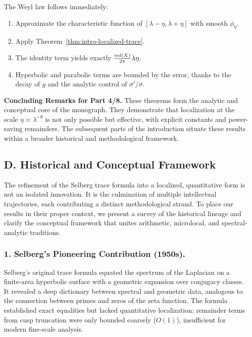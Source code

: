 The Weyl law follows immediately:

\begin{enumerate}[label=\arabic*.]
  \item Approximate the characteristic function of $[\lambda-\eta,\lambda+\eta]$
        with smooth $\phi_\eta$.
  \item Apply Theorem~\ref{thm:intro-localized-trace}.
  \item The identity term yields exactly $\frac{\operatorname{vol}(X)}{2\pi}\lambda\eta$.
  \item Hyperbolic and parabolic terms are bounded by the error,
        thanks to the decay of $g$ and the analytic control of $\sigma'/\sigma$.
\end{enumerate}

\medskip

\noindent\textbf{Concluding Remarks for Part 4/8.}
These theorems form the analytic and conceptual core of the monograph.
They demonstrate that localization at the scale $\eta\asymp\lambda^{-\theta}$
is not only possible but effective, with explicit constants and power-saving remainders.
The subsequent parts of the introduction situate these results within a broader
historical and methodological framework.


\subsection*{D. Historical and Conceptual Framework}

The refinement of the Selberg trace formula into a localized, quantitative form
is not an isolated innovation. It is the culmination of multiple intellectual trajectories,
each contributing a distinct methodological strand. To place our results in their proper context,
we present a survey of the historical lineage and clarify the conceptual framework
that unites arithmetic, microlocal, and spectral-analytic traditions.

\subsubsection*{1. Selberg’s Pioneering Contribution (1950s).}
Selberg’s original trace formula \cite{Selberg1956} equated the spectrum of the Laplacian
on a finite-area hyperbolic surface with a geometric expansion over conjugacy classes.
It revealed a deep dictionary between spectral and geometric data, analogous
to the connection between primes and zeros of the zeta function.
The formula established exact equalities but lacked quantitative localization:
remainder terms from cusp truncation were only bounded coarsely ($O(1)$),
insufficient for modern fine-scale analysis.

